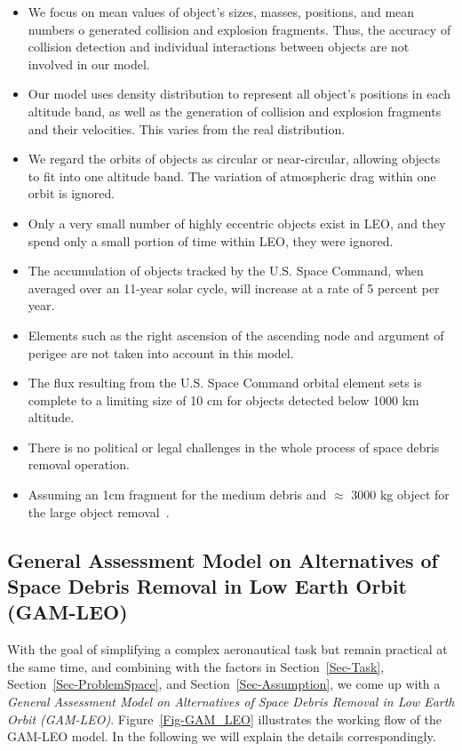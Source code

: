 \documentclass{mcmthesis}
\begin{document}
	\begin{itemize}
		\item We focus on mean values of object's sizes, masses, positions, and mean numbers o generated collision and explosion fragments. Thus, the accuracy of collision detection and individual interactions between objects are not involved in our model.
		\item Our model uses density distribution to represent all object's positions in each altitude band, as well as the generation of collision and explosion fragments and their velocities. This varies from the real distribution.
		\item We regard the orbits of objects as circular or near-circular, allowing objects to fit into one altitude band. The variation of atmospheric drag within one orbit is ignored.
		\item Only a very small number of highly eccentric objects exist in LEO, and they spend only a small portion of time within LEO, they were ignored.
		\item The accumulation of objects tracked by the U.S. Space Command, when averaged over an 11-year solar cycle, will increase at a rate of 5 percent per year.
		\item Elements such as the right ascension of the ascending node and argument of perigee are not taken into account in this model.
		\item The flux resulting from the U.S. Space Command orbital element sets is complete to a limiting size of 10 cm for objects detected below 1000 km altitude.
		\item There is no political or legal challenges in the whole process of space debris removal operation.
		\item Assuming an 1cm fragment for the medium debris and $\approx$ 3000 kg object for the large object removal~\cite{McKnight}.
	\end{itemize}
	
	
\subsection{General Assessment Model on Alternatives of Space Debris Removal in Low Earth Orbit (GAM-LEO)}
	
	With the goal of simplifying a complex aeronautical task but remain practical at the same time, and combining with the factors in Section~\ref{Sec-Task}, Section~\ref{Sec-ProblemSpace}, and Section~\ref{Sec-Assumption}, we come up with a \emph{General Assessment Model on Alternatives of Space Debris Removal in Low Earth Orbit (GAM-LEO)}. Figure~\ref{Fig-GAM_LEO} illustrates the working flow of the GAM-LEO model. In the following we will explain the details correspondingly.
\end{document}
